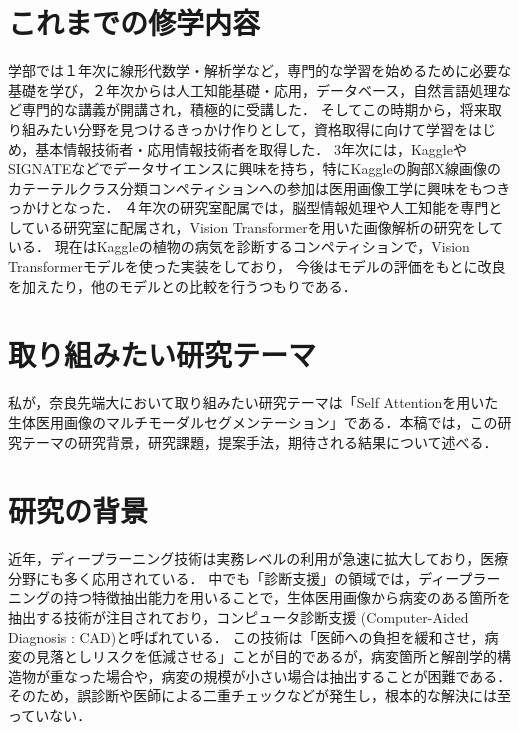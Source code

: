 \documentclass[a4j,10pt,twocolumn]{jarticle}
\begin{document}
\section{これまでの修学内容}
学部では１年次に線形代数学・解析学など，専門的な学習を始めるために必要な基礎を学び，２年次からは人工知能基礎・応用，データベース，自然言語処理など専門的な講義が開講され，積極的に受講した．
そしてこの時期から，将来取り組みたい分野を見つけるきっかけ作りとして，資格取得に向けて学習をはじめ，基本情報技術者・応用情報技術者を取得した．
3年次には，KaggleやSIGNATEなどでデータサイエンスに興味を持ち，特にKaggleの胸部X線画像のカテーテルクラス分類コンペティションへの参加は医用画像工学に興味をもつきっかけとなった．
４年次の研究室配属では，脳型情報処理や人工知能を専門としている研究室に配属され，Vision Transformerを用いた画像解析の研究をしている．
現在はKaggleの植物の病気を診断するコンペティションで，Vision Transformerモデルを使った実装をしており，
今後はモデルの評価をもとに改良を加えたり，他のモデルとの比較を行うつもりである．

\section{取り組みたい研究テーマ}
私が，奈良先端大において取り組みたい研究テーマは「Self Attentionを用いた生体医用画像のマルチモーダルセグメンテーション」である．本稿では，この研究テーマの研究背景，研究課題，提案手法，期待される結果について述べる．

\section{研究の背景}
近年，ディープラーニング技術は実務レベルの利用が急速に拡大しており，医療分野にも多く応用されている．
中でも「診断支援」の領域では，ディープラーニングの持つ特徴抽出能力を用いることで，生体医用画像から病変のある箇所を抽出する技術が注目されており，コンピュータ診断支援 (Computer-Aided Diagnosis : CAD)と呼ばれている． 
この技術は「医師への負担を緩和させ，病変の見落としリスクを低減させる」ことが目的であるが，病変箇所と解剖学的構造物が重なった場合や，病変の規模が小さい場合は抽出することが困難である．
そのため，誤診断や医師による二重チェックなどが発生し，根本的な解決には至っていない．
\end{document}

